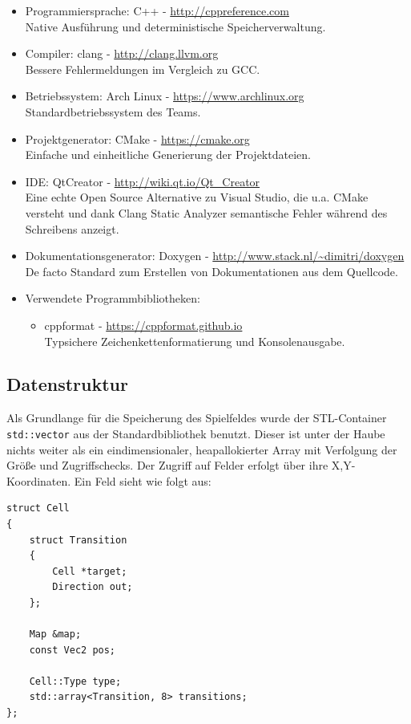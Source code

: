 \documentclass[12pt,a4paper]{article}
\begin{document}
\begin{itemize}
\item Programmiersprache: C++ - \url{http://cppreference.com} \\
Native Ausführung und deterministische Speicherverwaltung.
\item Compiler: clang - \url{http://clang.llvm.org} \\
Bessere Fehlermeldungen im Vergleich zu GCC.
\item Betriebssystem: Arch Linux - \url{https://www.archlinux.org} \\
Standardbetriebssystem des Teams.
\item Projektgenerator: CMake - \url{https://cmake.org} \\
Einfache und einheitliche Generierung der Projektdateien.
\item IDE: QtCreator - \url{http://wiki.qt.io/Qt_Creator} \\
Eine echte Open Source Alternative zu Visual Studio, die u.a. CMake versteht und dank Clang Static Analyzer semantische Fehler während des Schreibens anzeigt.
\item Dokumentationsgenerator: Doxygen - \url{http://www.stack.nl/~dimitri/doxygen} \\
De facto Standard zum Erstellen von Dokumentationen aus dem Quellcode.

\item Verwendete Programmbibliotheken:
\begin{itemize}
\item cppformat - \url{https://cppformat.github.io} \\
Typsichere Zeichenkettenformatierung und Konsolenausgabe.
	
\end{itemize}

\end{itemize}

\subsection{Datenstruktur}
Als Grundlange für die Speicherung des Spielfeldes wurde der STL-Container \texttt{std::vector} aus der Standardbibliothek benutzt. Dieser ist unter der Haube nichts weiter als ein eindimensionaler, heapallokierter Array mit Verfolgung der Größe und Zugriffschecks. Der Zugriff auf Felder erfolgt über ihre X,Y-Koordinaten.
Ein Feld sieht wie folgt aus:

\begin{lstlisting}[caption=\texttt{Cell} Struktur, label=lst:cell-struct]
struct Cell
{
	struct Transition
	{
		Cell *target;
		Direction out;
	};
	
	Map &map;
	const Vec2 pos;
	
	Cell::Type type;
	std::array<Transition, 8> transitions;
};
\end{lstlisting}
\end{document}
